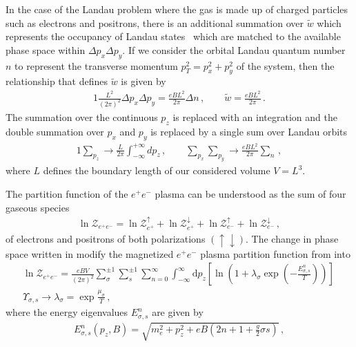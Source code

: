In the case of the Landau problem where the gas is made up of charged particles such as electrons and positrons, there is an additional summation over $\widetilde{w}$ which represents the occupancy of Landau states~\citep{greiner2012thermodynamics} which are matched to the available phase space within $\Delta p_{x}\Delta p_{y}$. If we consider the orbital Landau quantum number $n$ to represent the transverse momentum $p_{T}^{2}=p_{x}^{2}+p_{y}^{2}$ of the system, then the relationship that defines $\widetilde{w}$ is given by
\begin{alignat}{1}
    \label{phase:1} \frac{L^{2}}{(2\pi)^{2}}\Delta p_{x}\Delta p_{y}=\frac{eBL^{2}}{2\pi}\Delta n\,,\qquad\widetilde{w}=\frac{eBL^{2}}{2\pi}\,.
\end{alignat}
The summation over the continuous $p_{z}$ is replaced with an integration and the double summation over $p_{x}$ and $p_{y}$ is replaced by a single sum over Landau orbits
\begin{alignat}{1}
    \label{phase:2}
    \sum_{p_{z}}\rightarrow\frac{L}{2\pi}\int^{+\infty}_{-\infty}dp_{z}\,,\qquad\sum_{p_{x}}\sum_{p_{y}}\rightarrow\frac{eBL^{2}}{2\pi}\sum_{n}\,,
\end{alignat}
where $L$ defines the boundary length of our considered volume $V=L^{3}$.

The partition function of the $e^{+}e^{-}$ plasma can be understood as the sum of four gaseous species
\begin{align}
    \label{partition:0}    
    \ln\mathcal{Z}_{e^{+}e^{-}}=\ln\mathcal{Z}_{e^{+}}^{\uparrow}+\ln\mathcal{Z}_{e^{+}}^{\downarrow}+\ln\mathcal{Z}_{e^{-}}^{\uparrow}+\ln\mathcal{Z}_{e^{-}}^{\downarrow}\,,
\end{align}
of electrons and positrons of both polarizations $(\uparrow\downarrow)$. The change in phase space written in  modify the magnetized $e^{+}e^{-}$ plasma partition function from  into
\begin{gather}
     \label{partition:1}
     \ln\mathcal{Z}_{e^{+}e^{-}}=\frac{e{B}V}{(2\pi)^{2}}\sum_{\sigma}^{\pm1}\sum_{s}^{\pm1}\sum_{n=0}^{\infty}\int_{-\infty}^{\infty}\mathrm{d}p_{z}\left[\ln\left(1+\lambda_{\sigma}\exp\left(-\frac{E_{\sigma,s}^{n}}{T}\right)\right)\right]\,\\
    \label{partition:2}    
    \Upsilon_{\sigma,s} \rightarrow\lambda_{\sigma} = \exp{\frac{\mu_{\sigma}}{T}}\,,
\end{gather}
where the energy eigenvalues $E_{\sigma,s}^{n}$ are given by
\begin{align}
 \label{cosmokgp}
 E^{n}_{\sigma,s}(p_{z},{B})=\sqrt{m_{e}^{2}+p_{z}^{2}+e{B}\left(2n+1+\frac{g}{2}\sigma s\right)}\,,
\end{align}

